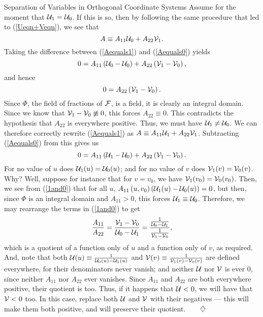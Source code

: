\begin{section}{Separation of Variables in Orthogonal Coordinate Systems}
Assume for the moment that $\mathcal{U}_1 = \mathcal{U}_0$.  If this is so, then by following the same procedure that led to (\ref{Ueqn+Veqn}), we see that
\begin{equation}
\label{Aequals1}
A \equiv A_{11} \mathcal{U}_0 + A_{22} \mathcal{V}_1.
\end{equation}
Taking the difference between (\ref{Aequals1}) and (\ref{Aequals0}) yields
\[
0 = A_{11}\left( \mathcal{U}_0 - \mathcal{U}_0 \right) + A_{22}\left( \mathcal{V}_1 - \mathcal{V}_0 \right),
\]
and hence
\[
0 = A_{22}\left( \mathcal{V}_1 - \mathcal{V}_0 \right).
\]
Since $\Phi$, the field of fractions of $\mathcal{F}$, is a field, it is clearly an integral domain.  Since we know that $\mathcal{V}_1 - \mathcal{V}_0 \not\equiv 0$, this forces $A_{22} \equiv 0$.  \contr  This contradicts the hypothesis that $A_{22}$ is everywhere positive.  Thus, we must have $\mathcal{U}_1 \not= \mathcal{U}_0$.  We can therefore correctly rewrite (\ref{Aequals1}) as $A \equiv A_{11} \mathcal{U}_1 + A_{22}\mathcal{V}_1$.  Subtracting (\ref{Aequals0}) from this gives us
\begin{equation}
\label{1and0}
0 = A_{11}\left( \mathcal{U}_1 - \mathcal{U}_0 \right) + A_{22}\left( \mathcal{V}_1 - \mathcal{V}_0 \right).
\end{equation}
For no value of $u$ does $\mathcal{U}_1(u) = \mathcal{U}_0(u)$; and for no value of $v$ does $\mathcal{V}_1(v) = \mathcal{V}_0(v)$.  Why?  Well, suppose for instance that for $v = v_0$, we have $\mathcal{V}_1(v_0) = \mathcal{V}_0(v_0)$.  Then, we see from (\ref{1and0}) that for all $u$, $A_{11}\left( u,v_0 \right) \left( \mathcal{U}_1(u) - \mathcal{U}_0(u) \right) = 0$, but then, since $\Phi$ is an integral domain and $A_{11} > 0$, this forces $\mathcal{U}_1 \equiv \mathcal{U}_0$. \contr  Therefore, we may rearrange the terms in (\ref{1and0}) to get
\begin{equation}
\label{ratioA11A22}
\frac{A_{11}}{A_{22}} = \frac{\mathcal{V}_1 - \mathcal{V}_0}{\mathcal{U}_0 - \mathcal{U}_1} = \frac{\frac{1}{\mathcal{U}_0 - \mathcal{U}_1}}{\frac{1}{\mathcal{V}_1 - \mathcal{V}_0}},
\end{equation}
which is a quotient of a function only of $u$ and a function only of $v$, as required.  And, note that  both $\mathcal{U}(u) \equiv \frac{1}{\mathcal{U}_0(u) - \mathcal{U}_1(u)}$ and $\mathcal{V}(v) \equiv \frac{1}{\mathcal{V}_1(v) - \mathcal{V}_0(v)}$ are defined everywhere, for their denominators never vanish; and  neither $\mathcal{U}$ nor $\mathcal{V}$ is ever $0$, since neither $A_{11}$ nor $A_{22}$ ever vanishes.  Since $A_{11}$ and $A_{22}$ are both everywhere positive, their quotient is too.  Thus, if it happens that $\mathcal{U} < 0$, we will have that $\mathcal{V} < 0 $ too.  In this case, replace both $\mathcal{U}$ and $\mathcal{V}$ with their negatives --- this will make them both positive, and will preserve their quotient.$\qquad \diamondsuit$


\end{section}
